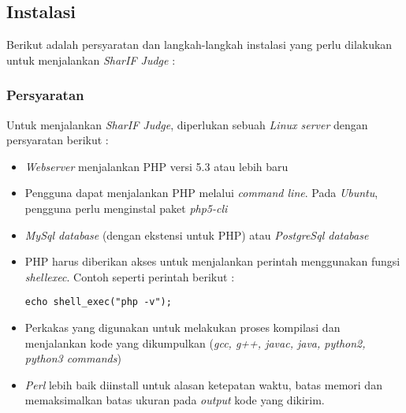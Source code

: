 \subsection{Instalasi}
Berikut adalah persyaratan dan langkah-langkah instalasi yang perlu dilakukan untuk menjalankan \textit{SharIF Judge} :

\subsubsection{Persyaratan}
\label{sec:persyaratan}
Untuk menjalankan \textit{SharIF Judge}, diperlukan sebuah \textit{Linux server} dengan persyaratan berikut :
\begin{itemize}
	\item \textit{Webserver} menjalankan PHP versi 5.3 atau lebih baru
	\item Pengguna dapat menjalankan PHP melalui \textit{command line}. Pada \textit{Ubuntu}, pengguna perlu menginstal paket \textit{php5-cli}
	\item \textit{MySql database} (dengan ekstensi untuk PHP) atau \textit{PostgreSql database}
	\item PHP harus diberikan akses untuk menjalankan perintah menggunakan fungsi \textit{shell\textunderscore exec}. Contoh seperti perintah berikut :
	\begin{lstlisting}[basicstyle=\ttfamily, frame=single,
	columns=fullflexible, keepspaces=true, breaklines=true, label=ls:1]
	echo shell_exec("php -v");
	\end{lstlisting}
	\item Perkakas yang digunakan untuk melakukan proses kompilasi dan menjalankan kode yang dikumpulkan (\textit{gcc, g++, javac, java, python2, python3 commands})
	\item \textit{Perl} lebih baik diinstall untuk alasan ketepatan waktu, batas memori dan memaksimalkan batas ukuran pada \textit{output} kode yang dikirim.
\end{itemize}

